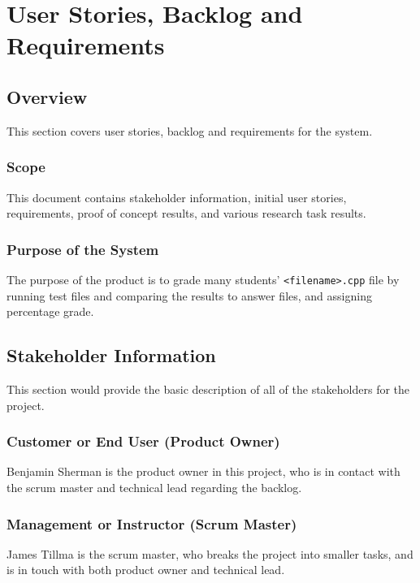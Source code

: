 \chapter{User Stories, Backlog and Requirements}
\section{Overview}


This section covers user stories, backlog and requirements for the system.  





\subsection{Scope}

This document contains stakeholder information, 
initial user stories, requirements, proof of concept results, and various research 
task results. 



\subsection{Purpose of the System}
The purpose of the product is to grade many students' {\tt <filename>.cpp} file by running test files and comparing the results to answer files, and assigning percentage grade.


\section{ Stakeholder Information}


This section would provide the basic description of all of the stakeholders for 
the project.

\subsection{Customer or End User (Product Owner)}
Benjamin Sherman is the product owner in this project, who is in contact with the scrum master and technical lead regarding the backlog. 

\subsection{Management or Instructor (Scrum Master)}
James Tillma is the scrum master, who breaks the project into smaller tasks, and is in touch with both product owner and technical lead.

